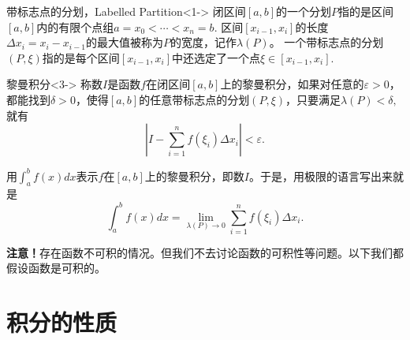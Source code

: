 \begin{frame}

\begin{block}{带标志点的分划，Labelled Partition}<1->
闭区间$[a,b]$的一个分划$P$指的是区间$[a,b]$内的有限个点组$a=x_0<\cdots<x_n=b.$ 区间$[x_{i-1},x_i]$的长度$\Delta x_i = x_i-x_{i-1}$的最大值被称为$P$的宽度，记作$\lambda(P)$。\newline\pause
一个带标志点的分划$(P,\xi)$指的是每个区间$[x_{i-1},x_i]$中还选定了一个点$\xi\in[x_{i-1},x_i].$
\end{block}

\begin{block}{黎曼积分}<3->
称数$I$是函数$f$在闭区间$[a,b]$上的黎曼积分，如果对任意的$\varepsilon > 0$，都能找到$\delta > 0$，使得$[a,b]$的任意带标志点的分划$(P,\xi)$，只要满足$\lambda(P) < \delta,$ 就有
$$\left| I - \sum\limits_{i=1}^n f(\xi_i)\Delta x_i \right| < \varepsilon.$$
\end{block}

\end{frame}


\begin{frame}

用$\int_a^b f(x)dx$表示$f$在$[a,b]$上的黎曼积分，即数$I$。于是，用极限的语言写出来就是
$$\int_a^b f(x)dx = \lim\limits_{\lambda(P) \to 0} \sum\limits_{i=1}^n f(\xi_i)\Delta x_i.$$

\vspace{2em}
\pause

{\bfseries 注意！}存在函数不可积的情况。但我们不去讨论函数的可积性等问题。以下我们都假设函数是可积的。

\end{frame}


\section{积分的性质}


